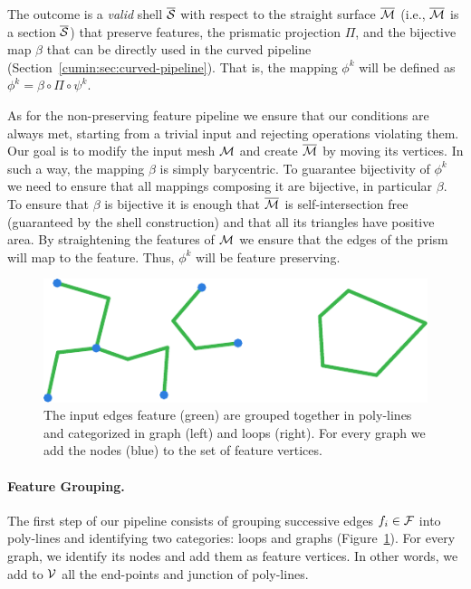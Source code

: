 The outcome {is} a \emph{valid} shell $\overline{\mathcal{S}}$ with respect to the {straight} surface $\overline{\mathcal{M}}$ (i.e., $\overline{\mathcal{M}}$ is a section $\overline{\mathcal{S}}$) that preserve features, the prismatic projection $\Pi$, and the bijective map $\beta$ that can be directly used in the curved pipeline (Section~\ref{cumin:sec:curved-pipeline}). That is, the mapping  $\phi^k$ will be defined as $\phi^k = \beta \circ \Pi \circ \psi^k$.

As for the non-preserving feature pipeline we ensure that our conditions are always met, starting {from} a trivial input and rejecting operations violating them. Our goal is to modify the input mesh $\mathcal{M}$ and create $\overline{\mathcal{M}}$ by moving its vertices. In such a way, the mapping $\beta$ is simply barycentric. To guarantee bijectivity of $\phi^k$ we need to ensure that all {mappings} composing it are bijective, in particular $\beta$. To ensure that $\beta$ is bijective it is enough that $\overline{\mathcal{M}}$ is self-intersection free (guaranteed by the shell construction) and that all its triangles have positive area. By straightening the features of $\mathcal{M}$ we ensure that the edges of the prism will map to the feature. Thus, $\phi^k$ will be feature preserving.


\begin{figure}
    \centering
    \includegraphics[width=0.65\linewidth]{curve_meshing_in_shell_tex/figs/illustrations/feat-gr.pdf}
    \caption{The input edges feature (green) are grouped together in poly-lines and categorized in graph (left) and loops (right). For every graph we add the nodes (blue) to the set of feature vertices.}
    \label{bichon:fig:feat-gr}
\end{figure}

\paragraph{Feature Grouping.}
The first step of our pipeline consists of grouping successive edges $f_i\in\mathcal{F}$ into poly-lines and identifying two categories: loops and graphs (Figure~\ref{bichon:fig:feat-gr}). For every graph, we identify its nodes and add them as feature vertices. In other words, we add to $\mathcal{V}$ all the end-points and junction of poly-lines.


